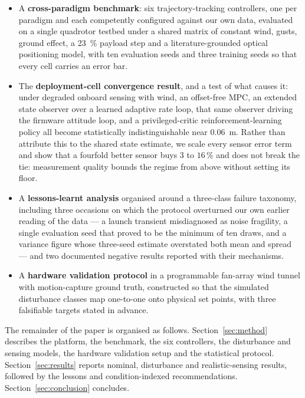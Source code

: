 \begin{itemize}
\item A \textbf{cross-paradigm benchmark}: six trajectory-tracking controllers, one per
      paradigm and each competently configured against our own data, evaluated on a
      single quadrotor testbed under a shared matrix of constant wind, gusts, ground
      effect, a \SI{23}{\percent} payload step and a literature-grounded optical
      positioning model, with ten evaluation seeds and three training seeds so that
      every cell carries an error bar.
\item The \textbf{deployment-cell convergence result}, and a test of what causes it:
      under degraded onboard sensing with wind, an offset-free MPC, an extended state
      observer over a learned adaptive rate loop, that same observer driving the
      firmware attitude loop, and a privileged-critic reinforcement-learning policy all
      become statistically indistinguishable near \SI{0.06}{\meter}. Rather than
      attribute this to the shared state estimate, we scale every sensor error term and
      show that a fourfold better sensor buys $3$ to $16\,\%$ and does not break the
      tie: measurement quality bounds the regime from above without setting its floor.
\item A \textbf{lessons-learnt analysis} organised around a three-class failure taxonomy,
      including three occasions on which the protocol overturned our own earlier reading
      of the data --- a launch transient misdiagnosed as noise fragility, a single
      evaluation seed that proved to be the minimum of ten draws, and a variance figure
      whose three-seed estimate overstated both mean and spread --- and two documented
      negative results reported with their mechanisms.
\item A \textbf{hardware validation protocol} in a programmable fan-array wind tunnel
      with motion-capture ground truth, constructed so that the simulated disturbance
      classes map one-to-one onto physical set points, with three falsifiable targets
      stated in advance.
\end{itemize}

The remainder of the paper is organised as follows. Section~\ref{sec:method} describes
the platform, the benchmark, the six controllers, the disturbance and sensing models,
the hardware validation setup and the statistical protocol.
Section~\ref{sec:results} reports nominal, disturbance and realistic-sensing results,
followed by the lessons and condition-indexed recommendations.
Section~\ref{sec:conclusion} concludes.
